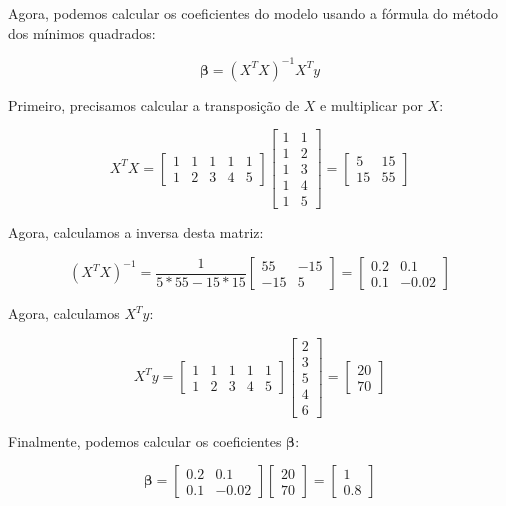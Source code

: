 \documentclass[12pt,a4paper, brazil]{article}
\begin{document}
Agora, podemos calcular os coeficientes do modelo usando a fórmula do método dos mínimos quadrados:

$$\boldsymbol{\beta} = (X^TX)^{-1}X^Ty$$

Primeiro, precisamos calcular a transposição de $X$ e multiplicar por $X$:

$$X^TX = \begin{bmatrix} 1 & 1 & 1 & 1 & 1 \\ 1 & 2 & 3 & 4 & 5 \end{bmatrix} \begin{bmatrix} 1 & 1 \\ 1 & 2 \\ 1 & 3 \\ 1 & 4 \\ 1 & 5 \end{bmatrix} = \begin{bmatrix} 5 & 15 \\ 15 & 55 \end{bmatrix}$$

Agora, calculamos a inversa desta matriz:

$$(X^TX)^{-1} = \frac{1}{5*55 - 15*15} \begin{bmatrix} 55 & -15 \\ -15 & 5 \end{bmatrix} = \begin{bmatrix} 0.2 & 0.1 \\ 0.1 & -0.02 \end{bmatrix}$$

Agora, calculamos $X^Ty$:

$$X^Ty = \begin{bmatrix} 1 & 1 & 1 & 1 & 1 \\ 1 & 2 & 3 & 4 & 5 \end{bmatrix} \begin{bmatrix} 2 \\ 3 \\ 5 \\ 4 \\ 6 \end{bmatrix} = \begin{bmatrix} 20 \\ 70 \end{bmatrix}$$

Finalmente, podemos calcular os coeficientes $\boldsymbol{\beta}$:

$$\boldsymbol{\beta} = \begin{bmatrix} 0.2 & 0.1 \\ 0.1 & -0.02 \end{bmatrix} \begin{bmatrix} 20 \\ 70 \end{bmatrix} = \begin{bmatrix} 1 \\ 0.8 \end{bmatrix}$$
\end{document}
